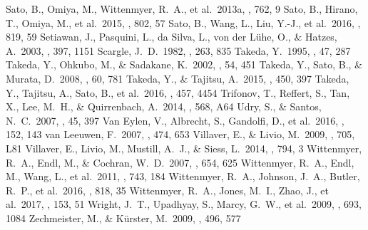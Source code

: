 \documentclass[]{pasj01}
\begin{document}
\begin{thebibliography}{}
Sato, B., Omiya, M., Wittenmyer, R.~A., et al.\ 2013a, \apj, 762, 9 
Sato, B., Hirano, T., Omiya, M., et al.\ 2015, \apj, 802, 57 
Sato, B., Wang, L., Liu, Y.-J., et al.\ 2016, \apj, 819, 59
Setiawan, J., Pasquini, L., da Silva, L., von der L{\"u}he, O., \& Hatzes, A.\ 2003, \aap, 397, 1151 
Scargle, J.~D.\ 1982, \apj, 263, 835 
Takeda, Y.\ 1995, \pasj, 47, 287 
Takeda, Y., Ohkubo, M., \& Sadakane, K.\ 2002, \pasj, 54, 451 
Takeda, Y., Sato, B., \& Murata, D.\ 2008, \pasj, 60, 781 
Takeda, Y., \& Tajitsu, A.\ 2015, \mnras, 450, 397 
Takeda, Y., Tajitsu, A., Sato, B., et al.\ 2016, \mnras, 457, 4454 
Trifonov, T., Reffert, S., Tan, X., Lee, M.~H., \& Quirrenbach, A.\ 2014, \aap, 568, A64 
Udry, S., \& Santos, N.~C.\ 2007, \araa, 45, 397 
Van Eylen, V., Albrecht, S., Gandolfi, D., et al.\ 2016, \aj, 152, 143 
van Leeuwen, F.\ 2007, \aap, 474, 653 
Villaver, E., \& Livio, M.\ 2009, \apjl, 705, L81
Villaver, E., Livio, M., Mustill, A.~J., \& Siess, L.\ 2014, \apj, 794, 3 
Wittenmyer, R.~A., Endl, M., \& Cochran, W.~D.\ 2007, \apj, 654, 625 
Wittenmyer, R.~A., Endl, M., Wang, L., et al.\ 2011, \apj, 743, 184 
Wittenmyer, R.~A., Johnson, J.~A., Butler, R.~P., et al.\ 2016, \apj, 818, 35 
Wittenmyer, R.~A., Jones, M.~I., Zhao, J., et al.\ 2017, \aj, 153, 51 
Wright, J.~T., Upadhyay, S., Marcy, G.~W., et al.\ 2009, \apj, 693, 1084 
Zechmeister, M., \& K{\"u}rster, M.\ 2009, \aap, 496, 577 
\end{thebibliography}
\end{document}
